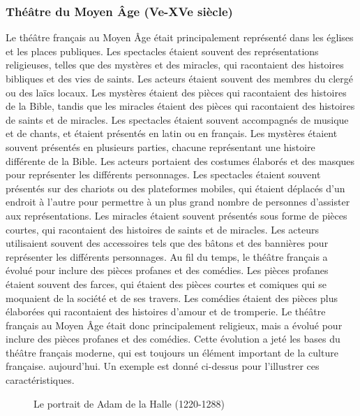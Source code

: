 \documentclass[UTF8,a4paper,12pt]{ctexart}
\numberwithin{equation}{section}
\newcommand{\mycite}[1]{\cite{#1}}
\begin{document}
\subsubsection{Théâtre du Moyen Âge (Ve-XVe siècle)}
Le théâtre français au Moyen Âge était principalement représenté dans les églises et les places publiques\mycite{mazouer2016theatre}. Les spectacles étaient souvent des représentations religieuses, telles que des mystères et des miracles, qui racontaient des histoires bibliques et des vies de saints. Les acteurs étaient souvent des membres du clergé ou des laïcs locaux. Les mystères étaient des pièces qui racontaient des histoires de la Bible, tandis que les miracles étaient des pièces qui racontaient des histoires de saints et de miracles. Les spectacles étaient souvent accompagnés de musique et de chants, et étaient présentés en latin ou en français. Les mystères étaient souvent présentés en plusieurs parties, chacune représentant une histoire différente de la Bible. Les acteurs portaient des costumes élaborés et des masques pour représenter les différents personnages. Les spectacles étaient souvent présentés sur des chariots ou des plateformes mobiles, qui étaient déplacés d'un endroit à l'autre pour permettre à un plus grand nombre de personnes d'assister aux représentations. Les miracles étaient souvent présentés sous forme de pièces courtes, qui racontaient des histoires de saints et de miracles. Les acteurs utilisaient souvent des accessoires tels que des bâtons et des bannières pour représenter les différents personnages. Au fil du temps, le théâtre français a évolué pour inclure des pièces profanes et des comédies. Les pièces profanes étaient souvent des farces, qui étaient des pièces courtes et comiques qui se moquaient de la société et de ses travers. Les comédies étaient des pièces plus élaborées qui racontaient des histoires d'amour et de tromperie. Le théâtre français au Moyen Âge était donc principalement religieux, mais a évolué pour inclure des pièces profanes et des comédies. Cette évolution a jeté les bases du théâtre français moderne, qui est toujours un élément important de la culture française. aujourd'hui. Un exemple est donné ci-dessus pour l'illustrer ces caractéristiques.
\begin{figure}[H] 
\caption{Le portrait de Adam de la Halle (1220-1288)}
\end{figure}
\end{document}
